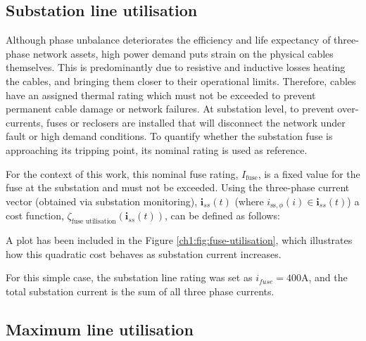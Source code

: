 \subsection{Substation line utilisation}
\label{ch1:subsec:substation-line-utilisation}

Although phase unbalance deteriorates the efficiency and life expectancy of three-phase network assets, high power demand puts strain on the physical cables themselves.
This is predominantly due to resistive and inductive losses heating the cables, and bringing them closer to their operational limits.
Therefore, cables have an assigned thermal rating which must not be exceeded to prevent permanent cable damage or network failures.
At substation level, to prevent over-currents, fuses or reclosers are installed that will disconnect the network under fault or high demand conditions.
To quantify whether the substation fuse is approaching its tripping point, its nominal rating is used as reference.


For the context of this work, this nominal fuse rating, $I_\text{fuse}$, is a fixed value for the fuse at the substation and must not be exceeded.
Using the three-phase current vector (obtained via substation monitoring), $\textbf{i}_{ss}(t)$ (where $i_{\text{ss},\phi}(i) \in \textbf{i}_{ss}(t)$) a cost function, $\zeta_\text{fuse utilisation}(\textbf{i}_{ss}(t))$, can be defined as follows:



A plot has been included in the Figure \ref{ch1:fig:fuse-utilisation}, which illustrates how this quadratic cost behaves as substation current increases.



For this simple case, the substation line rating was set as $i_{fuse}=400\text{A}$, and the total substation current is the sum of all three phase currents.

\subsection{Maximum line utilisation}
\label{ch1:subsec:maximum-line-utilisation}


